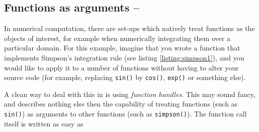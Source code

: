 % 
% 
% 

\subsection{Functions as arguments -- \cleansymbol\cleansymbol\cleansymbol}

In numerical computation, there are set-ups which natively treat functions as the objects of interest, for example when numerically integrating them over a particular domain. For this example, imagine that you wrote a function that implements Simpson's integration rule (see listing \ref{listing:simpson1}), and you would like to apply it to a number of functions without having to alter your source code (for example, replacing \lstinline!sin()! by \lstinline!cos()!, \lstinline!exp()! or something else).

A clean way to deal with this in \matlab{} is using \emph{function handles}. This may sound fancy, and describes nothing else then the capability of treating functions (such as \lstinline!sin()!) as arguments to other functions (such as \lstinline!simpson()!). The function call itself is written as easy as

